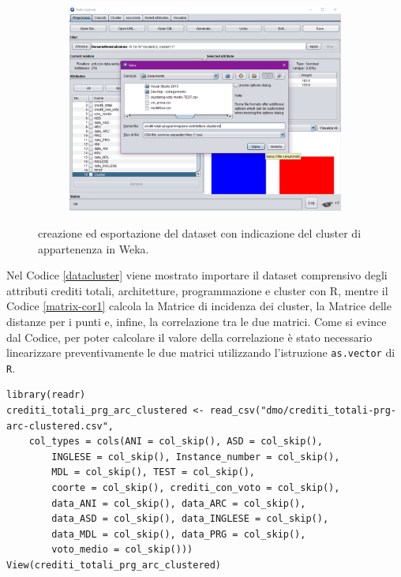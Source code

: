 \documentclass[12pt]{article}
\begin{document}
\begin{figure}
\begin{subfigure}[b]{0.4\textwidth}
	\end{subfigure}
	\begin{subfigure}[b]{0.4\textwidth}
	\includegraphics[width=\textwidth]{img/save-cluster-ass-4.pdf}
	\end{subfigure}
	\caption{creazione ed esportazione del dataset con indicazione del cluster di appartenenza in Weka.}
	\label{fig:add-cluster}
\end{figure}

Nel Codice \ref{datacluster} viene mostrato importare il dataset comprensivo degli attributi crediti totali, architetture, programmazione e cluster con R, mentre il Codice \ref{matrix-cor1} calcola la Matrice di incidenza dei cluster, la Matrice delle distanze per i punti e, infine, la correlazione tra le due matrici. Come si evince dal Codice, per poter calcolare il valore della correlazione è stato necessario linearizzare preventivamente le due matrici utilizzando l'istruzione \texttt{as.vector} di \texttt{R}.

\lstset{%
   breaklines=true
}

\begin{lstlisting}[caption={Importazione degli attributi crediti totali, architetture, programmazione e cluster.}, label={datacluster}, captionpos=b, style = R]
library(readr)
crediti_totali_prg_arc_clustered <- read_csv("dmo/crediti_totali-prg-arc-clustered.csv", 
    col_types = cols(ANI = col_skip(), ASD = col_skip(), 
        INGLESE = col_skip(), Instance_number = col_skip(), 
        MDL = col_skip(), TEST = col_skip(), 
        coorte = col_skip(), crediti_con_voto = col_skip(), 
        data_ANI = col_skip(), data_ARC = col_skip(), 
        data_ASD = col_skip(), data_INGLESE = col_skip(), 
        data_MDL = col_skip(), data_PRG = col_skip(), 
        voto_medio = col_skip()))
View(crediti_totali_prg_arc_clustered)
\end{lstlisting}
\end{document}
